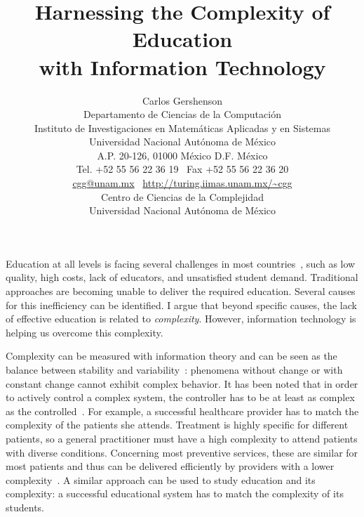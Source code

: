 \documentclass[12pt]{article}
\begin{document}
\title{Harnessing the Complexity of Education\\ with Information Technology} 

\author
{Carlos Gershenson\\
 Departamento de Ciencias de la Computaci\'on\\
Instituto de Investigaciones en Matem\'aticas Aplicadas y en Sistemas \\
Universidad Nacional Aut\'onoma de M\'exico\\
A.P. 20-126, 01000 M\'exico D.F. M\'exico\\
Tel. +52 55 56 22 36 19 \
Fax +52 55 56 22 36 20 \\
\href{mailto:cgg@unam.mx}{cgg@unam.mx} \
\url{http://turing.iimas.unam.mx/~cgg} \\
 Centro de Ciencias de la Complejidad \\
Universidad Nacional Aut\'onoma de M\'exico
}







\maketitle 



Education at all levels is facing several challenges in most countries~\cite{Linn1987SciEdu,Robinson1998All-Our-Futures,Hines2013EduChallenges,Kremer2013EduDevWorld}, such as low quality, high costs, lack of educators, and unsatisfied student demand. Traditional approaches are becoming unable to deliver the required education. Several causes for this inefficiency can be identified. I argue that beyond specific causes, the lack of effective education is related to \emph{complexity}. However, information technology is helping us overcome this complexity.


Complexity can be measured with information theory and can be seen as the balance between stability and variability~\cite{Langton1990,Prokopenko:2008,GershensonFernandez:2012}: phenomena without change or with constant change cannot exhibit complex behavior. It has been noted that in order to actively control a complex system, the controller has to be at least as complex as the controlled~\cite{Ashby1956,BarYam2004}. For example, a successful healthcare provider has to match the complexity of the patients she attends. Treatment is highly specific for different patients, so a general practitioner must have a high complexity to attend patients with diverse conditions. Concerning most preventive services, these are similar for most patients and thus can be delivered efficiently by providers with a lower complexity~\cite{BarYamAJPH2006}. A similar approach can be used to study education and its complexity: a successful educational system has to match the complexity of its students.
\end{document}
